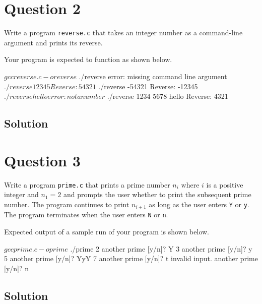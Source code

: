 \documentclass[12pt,letterpaper,twoside]{article}
\begin{document}
\section*{Question 2}

Write a program \texttt{reverse.c} that takes an integer number as a command-line argument and prints its reverse.

Your program is expected to function as shown below.

\begin{terminal}
$ gcc reverse.c -o reverse
$ ./reverse
error: missing command line argument
$ ./reverse 12345
Reverse: 54321
$ ./reverse -54321
Reverse: -12345
$ ./reverse hello
error: not a number
$ ./reverse 1234 5678 hello
Reverse: 4321
\end{terminal}

\subsection*{Solution}

\lstset{language=c,tabsize=4}


\newpage

\section*{Question 3}

Write a program \texttt{prime.c} that prints a prime number $n_i$ where $i$ is a positive integer and $n_1 = 2$ and prompts the user whether to print the subsequent prime number.
The program continues to print $n_{i+1}$ as long as the user enters \texttt{Y} or \texttt{y}.
The program terminates when the user enters \texttt{N} or \texttt{n}.

Expected output of a sample run of your program is shown below.

\begin{terminal}
$ gcc prime.c -o prime
$ ./prime
2
another prime [y/n]? Y
3
another prime [y/n]? y
5
another prime [y/n]? YyY
7
another prime [y/n]? t
invalid input.
another prime [y/n]? n
\end{terminal}

\subsection*{Solution}

\lstset{language=c,tabsize=4}

\end{document}
